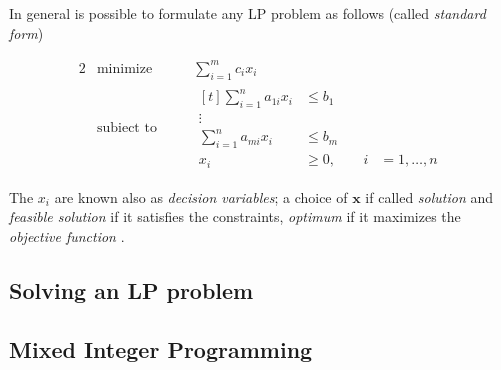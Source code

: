 %
In general is possible to formulate any \acrshort{LP} problem as follows (called \emph{standard form}) \cite{Vanderbei2008}

\begin{alignat*}{2}
	 & \text{minimize}   &       & \sum_{i=1}^{m} c_{i}x_{i} \\
	 & \text{subiect to} & \quad &
	\begin{aligned}[t]
		\sum_{i=1}^{n} a_{1i}  x_{i} & \leq b_{1} &                        \\
		\vdots                                                             \\
		\sum_{i=1}^{n} a_{mi}  x_{i} & \leq b_{m} &                        \\
		x_{i}                        & \geq 0,    & \quad i & =1 ,\dots, n
	\end{aligned}
\end{alignat*}

The $x_i$ are known also as \emph{decision variables}; a choice of $ \mathbf{x}
$ if called \emph{solution} and \emph{feasible solution} if it satisfies the
constraints, \emph{optimum} if it maximizes the \emph{objective function}
\cite{Vanderbei2008}.

\subsection{Solving an LP problem}%
\label{sub:solving_an_lp_problem}

\subsection{Mixed Integer Programming}%
\label{sub:mixed_integer_programming}

